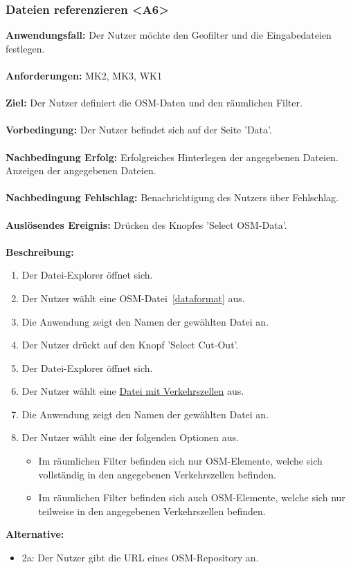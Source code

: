 \documentclass[parskip=full]{scrartcl} %
\begin{document}
\subsubsection*{Dateien referenzieren <A6>}
\textbf{Anwendungsfall:} Der Nutzer möchte den Geofilter und die Eingabedateien festlegen.\\\\
\textbf{Anforderungen:} MK2, MK3, WK1 \\\\
\textbf{Ziel:} Der Nutzer definiert die OSM-Daten und den räumlichen Filter.\\\\
\textbf{Vorbedingung:} Der Nutzer befindet sich auf der Seite 'Data'. \\\\
\textbf{Nachbedingung Erfolg:} Erfolgreiches Hinterlegen der angegebenen Dateien. Anzeigen der angegebenen Dateien.\\\\
\textbf{Nachbedingung Fehlschlag:} Benachrichtigung des Nutzers über Fehlschlag. \\\\
\textbf{Auslösendes Ereignis:} Drücken des Knopfes 'Select OSM-Data'.\\\\
\textbf{Beschreibung:}
\begin{enumerate}
    \item Der Datei-Explorer öffnet sich.
    \item Der Nutzer wählt eine {OSM-Datei}~\ref{dataformat} aus.
    \item Die Anwendung zeigt den Namen der gewählten Datei an.
    \item Der Nutzer drückt auf den Knopf 'Select Cut-Out'.
    \item Der Datei-Explorer öffnet sich.
    \item Der Nutzer wählt eine \hyperlink{dataformat}{Datei mit Verkehrszellen} aus.
    \item Die Anwendung zeigt den Namen der gewählten Datei an.
    \item Der Nutzer wählt eine der folgenden Optionen aus.
    \begin{itemize}
        \item Im räumlichen Filter befinden sich nur OSM-Elemente, welche sich vollständig in den angegebenen Verkehrszellen befinden.
        \item Im räumlichen Filter befinden sich auch OSM-Elemente, welche sich nur teilweise in den angegebenen Verkehrszellen befinden.
    \end{itemize}
\end{enumerate}
\textbf{Alternative:}
\begin{itemize}
    \item 2a: Der Nutzer gibt die URL eines OSM-Repository an.
\end{itemize}
\newpage
\end{document}
